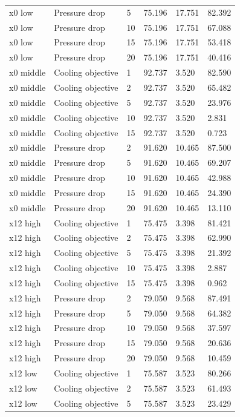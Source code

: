 \begin{longtable}{llllll}
x0 low & Pressure drop & 5 & 75.196 & 17.751 & 82.392\\
x0 low & Pressure drop & 10 & 75.196 & 17.751 & 67.088\\
x0 low & Pressure drop & 15 & 75.196 & 17.751 & 53.418\\
x0 low & Pressure drop & 20 & 75.196 & 17.751 & 40.416\\
x0 middle & Cooling objective & 1 & 92.737 & 3.520 & 82.590\\
x0 middle & Cooling objective & 2 & 92.737 & 3.520 & 65.482\\
x0 middle & Cooling objective & 5 & 92.737 & 3.520 & 23.976\\
x0 middle & Cooling objective & 10 & 92.737 & 3.520 & 2.831\\
x0 middle & Cooling objective & 15 & 92.737 & 3.520 & 0.723\\
x0 middle & Pressure drop & 2 & 91.620 & 10.465 & 87.500\\
x0 middle & Pressure drop & 5 & 91.620 & 10.465 & 69.207\\
x0 middle & Pressure drop & 10 & 91.620 & 10.465 & 42.988\\
x0 middle & Pressure drop & 15 & 91.620 & 10.465 & 24.390\\
x0 middle & Pressure drop & 20 & 91.620 & 10.465 & 13.110\\
x12 high & Cooling objective & 1 & 75.475 & 3.398 & 81.421\\
x12 high & Cooling objective & 2 & 75.475 & 3.398 & 62.990\\
x12 high & Cooling objective & 5 & 75.475 & 3.398 & 21.392\\
x12 high & Cooling objective & 10 & 75.475 & 3.398 & 2.887\\
x12 high & Cooling objective & 15 & 75.475 & 3.398 & 0.962\\
x12 high & Pressure drop & 2 & 79.050 & 9.568 & 87.491\\
x12 high & Pressure drop & 5 & 79.050 & 9.568 & 64.382\\
x12 high & Pressure drop & 10 & 79.050 & 9.568 & 37.597\\
x12 high & Pressure drop & 15 & 79.050 & 9.568 & 20.636\\
x12 high & Pressure drop & 20 & 79.050 & 9.568 & 10.459\\
x12 low & Cooling objective & 1 & 75.587 & 3.523 & 80.266\\
x12 low & Cooling objective & 2 & 75.587 & 3.523 & 61.493\\
x12 low & Cooling objective & 5 & 75.587 & 3.523 & 23.429\\

\end{longtable}
